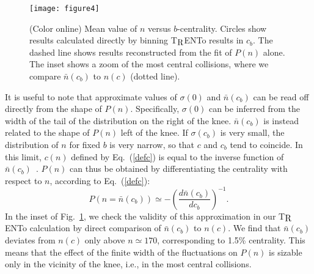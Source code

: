 \documentclass[aps,prc,twocolumn,superscriptaddress,showpacs,floatfix,nofootinbib]{revtex4-1}
\newcommand{\trento}{T$\mathrel{\protect\raisebox{-2.1pt}{R}}$ENTo}
\begin{document}
\begin{figure}[t!]
\begin{center}
\texttt{[image: figure4]}
\end{center}
\caption{(Color online) Mean value of $n$ versus $b$-centrality. 
Circles show results calculated directly by binning \trento{} results in $c_b$. The dashed line shows results reconstructed from the fit of $P(n)$ alone. The inset shows a zoom of the most central collisions, where we compare $\bar n (c_b)$ to $n(c)$ (dotted line).
}
\label{fig:trentoebar}
\end{figure}

It is useful to note that approximate values of $\sigma(0)$ and $\bar n(c_b)$ can be read off directly from the shape of $P(n)$. 
Specifically, $\sigma(0)$ can be inferred from the width of the tail of the distribution on the right of the knee.  
$\bar n(c_b)$ is instead related to the shape of $P(n)$ left of the knee.
If $\sigma(c_b)$ is very small, the distribution of $n$ for fixed $b$ is very narrow, so that $c$ and $c_b$ tend to coincide. 
In this limit, $c(n)$ defined by Eq.~(\ref{defc}) is equal to the inverse function of $\bar n(c_b)$~\cite{Broniowski:2001ei}. 
$P(n)$ can thus be obtained by differentiating the centrality with respect to $n$, according to Eq.~(\ref{defc}): 
\begin{equation}
\label{blablabla}
P\left(n=\bar n(c_b)\right)\simeq -\left(\frac{d\bar n(c_b)}{dc_b}\right)^{-1}.
\end{equation}
In the inset of Fig.~\ref{fig:trentoebar}, we check the validity of this approximation in our \trento{} calculation by direct comparison of $\bar n (c_b)$ to $n(c)$.
We find that $\bar n (c_b)$ deviates from $n(c)$ only above $n\simeq 170$, corresponding to 1.5\% centrality.
This means that the effect of the finite width of the fluctuations on $P(n)$ is sizable only in the vicinity of the knee, i.e., in the most central collisions.
\end{document}
